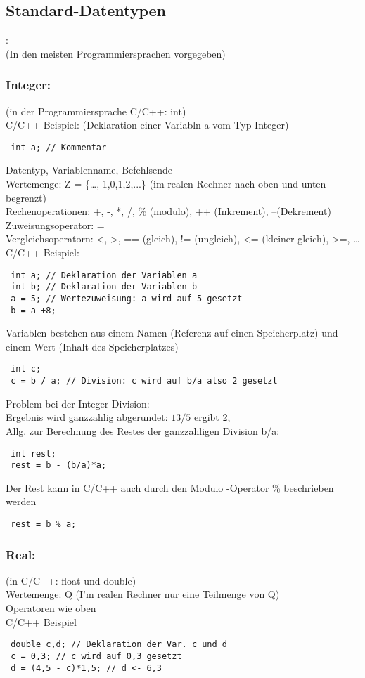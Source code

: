  \subsection{Standard-Datentypen}: \\
 (In den meisten Programmiersprachen vorgegeben)
 \subsubsection{Integer:} (in der Programmiersprache C/C++: int) \\
 C/C++ Beispiel: (Deklaration einer Variabln a vom Typ Integer) \\
 \begin{lstlisting}
 int a; // Kommentar
 \end{lstlisting} 
 Datentyp, Variablenname, Befehlsende \\
 Wertemenge: Z = \{\dots,-1,0,1,2,...\} (im realen Rechner nach oben und unten begrenzt) \\
 Rechenoperationen: +, -, *, /, \% (modulo), ++ (Inkrement), --(Dekrement) \\
 Zuweisungsoperator: = \\
 Vergleichsoperatorn: <, >, == (gleich), != (ungleich), <= (kleiner gleich), >=, \dots \\
 C/C++ Beispiel: \\
 \begin{lstlisting}
 int a; // Deklaration der Variablen a
 int b; // Deklaration der Variablen b
 a = 5; // Wertezuweisung: a wird auf 5 gesetzt
 b = a +8;
 \end{lstlisting}
 Variablen bestehen aus einem Namen (Referenz auf einen Speicherplatz) und einem Wert (Inhalt des Speicherplatzes)
 \begin{lstlisting}
 int c;
 c = b / a; // Division: c wird auf b/a also 2 gesetzt
 \end{lstlisting}
 Problem bei der Integer-Division: \\
 Ergebnis wird ganzzahlig abgerundet: $13 / 5$ ergibt 2, \\
 Allg. zur Berechnung des Restes der ganzzahligen Division b/a:
 \begin{lstlisting}
 int rest;
 rest = b - (b/a)*a;
 \end{lstlisting}
 Der Rest kann in C/C++ auch durch den Modulo -Operator \% beschrieben werden
 \begin{lstlisting}
 rest = b % a;
 \end{lstlisting}
 
 \subsubsection{Real:} (in C/C++: float und double) \\
 Wertemenge: Q (I'm realen Rechner nur eine Teilmenge von Q) \\
 Operatoren wie oben \\
 C/C++ Beispiel
 \begin{lstlisting}
 double c,d; // Deklaration der Var. c und d
 c = 0,3; // c wird auf 0,3 gesetzt
 d = (4,5 - c)*1,5; // d <- 6,3 
 \end{lstlisting}
 
